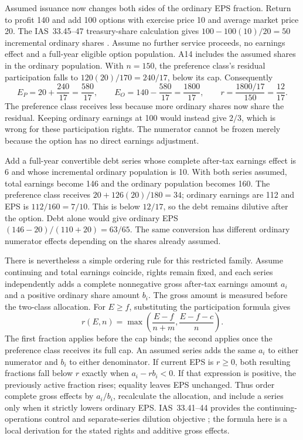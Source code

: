 Assumed issuance now changes both sides of the ordinary EPS fraction. Return
to profit 140 and add 100 options with exercise price 10 and average market
price 20. The IAS~33.45--47 treasury-share calculation gives
\(100-100(10)/20=50\) incremental ordinary shares
\citep[IAS~33.45--47]{eu20231803}. Assume no further service proceeds, no
earnings effect and a full-year eligible option population. A14 includes the
assumed shares in the ordinary population. With \(n=150\), the preference
class's residual participation falls to \(120(20)/170=240/17\), below its
cap. Consequently
\[
 E_P=20+\frac{240}{17}=\frac{580}{17},\qquad
 E_O=140-\frac{580}{17}=\frac{1800}{17},\qquad
 r=\frac{1800/17}{150}=\frac{12}{17}.
\]
The preference class receives less because more ordinary shares now share the
residual. Keeping ordinary earnings at 100 would instead give \(2/3\), which
is wrong for these participation rights. The numerator cannot be frozen merely
because the option has no direct earnings adjustment.

Add a full-year convertible debt series whose complete after-tax earnings
effect is 6 and whose incremental ordinary population is 10. With both series
assumed, total earnings become 146 and the ordinary population becomes 160.
The preference class receives \(20+126(20)/180=34\); ordinary earnings are
112 and EPS is \(112/160=7/10\). This is below \(12/17\), so the debt
remains dilutive after the option. Debt alone would give ordinary EPS
\((146-20)/(110+20)=63/65\). The same conversion has different ordinary
numerator effects depending on the shares already assumed.

There is nevertheless a simple ordering rule for this restricted family.
Assume continuing and total earnings coincide, rights remain fixed, and each
series independently adds a complete nonnegative gross after-tax earnings
amount \(a_i\) and a positive ordinary share amount \(b_i\). The gross
amount is measured before the two-class allocation. For \(E\geq f\),
substituting the participation formula gives
\[
 r(E,n)=\max\!\left(\frac{E-f}{n+m},\frac{E-f-c}{n}\right).
\]
The first fraction applies before the cap binds; the second applies once the
preference class receives its full cap. An assumed series adds the same
\(a_i\) to either numerator and \(b_i\) to either denominator. If current
EPS is \(r\geq0\), both resulting fractions fall below \(r\) exactly when
\(a_i-rb_i<0\). If that expression is positive, the previously active
fraction rises; equality leaves EPS unchanged. Thus order complete gross
effects by \(a_i/b_i\), recalculate the allocation, and include a series only
when it strictly lowers ordinary EPS. IAS~33.41--44 provides the continuing-
operations control and separate-series dilution objective
\citep[IAS~33.33--44]{eu20231803}; the formula here is a local derivation for
the stated rights and additive gross effects.

